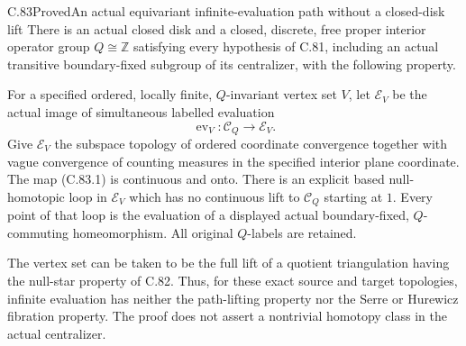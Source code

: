 \begin{claim}{C.83}{Proved}{An actual equivariant infinite-evaluation path without a closed-disk lift}
There is an actual closed disk and a closed,
discrete, free proper interior operator group
$Q\cong\mathbb Z$ satisfying every hypothesis of
C.81, including an actual transitive
boundary-fixed subgroup of its centralizer,
with the following property.

For a specified ordered, locally finite,
$Q$-invariant vertex set $V$, let
$\mathscr E_V$ be the actual image of
simultaneous labelled evaluation
\[
 \operatorname{ev}_V:\mathscr C_Q\longrightarrow\mathscr E_V.
                                                               \tag{C.83.1}
\]
Give $\mathscr E_V$ the subspace topology of
ordered coordinate convergence together with
vague convergence of counting measures in the
specified interior plane coordinate.
The map (C.83.1) is continuous and onto.
There is an explicit based null-homotopic loop in
$\mathscr E_V$ which has no continuous lift
to $\mathscr C_Q$ starting at $1$.
Every point of that loop is the evaluation
of a displayed actual boundary-fixed,
$Q$-commuting homeomorphism. All original
$Q$-labels are retained.

The vertex set can be taken to be the full
lift of a quotient triangulation having the
null-star property of C.82. Thus, for these
exact source and target topologies, infinite
evaluation has neither the path-lifting
property nor the Serre or Hurewicz fibration
property. The proof does not assert a
nontrivial homotopy class in the actual
centralizer.
\end{claim}

